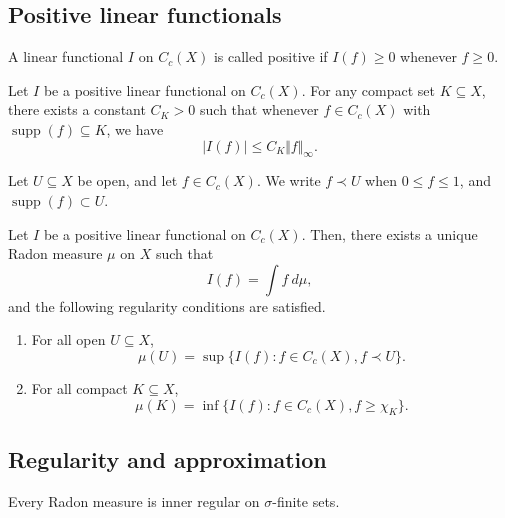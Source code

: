 \documentclass[11pt]{article}
\newcommand{\norm}[1]{\Vert #1 \Vert}
\DeclareMathOperator{\supp}{supp}
\theoremstyle{definition}
\theoremstyle{remark}
\begin{document}
    \subsection{Positive linear functionals}

    \begin{definition}
        A linear functional $I$ on $C_c(X)$ is called positive if $I(f) \geq 0$
        whenever $f \geq 0$.
    \end{definition}

    \begin{lemma}
        Let $I$ be a positive linear functional on $C_c(X)$. For any compact set $K
        \subseteq X$, there exists a constant $C_K > 0$ such that whenever $f \in
        C_c(X)$ with $\supp(f) \subseteq K$, we have \[
            |I(f)| \leq C_K \norm{f}_\infty.
        \]
    \end{lemma}

    \begin{definition}
        Let $U \subseteq X$ be open, and let $f \in C_c(X)$. We write $f \prec U$
        when $0 \leq f \leq 1$, and $\supp(f) \subset U$.
    \end{definition}

    \begin{theorem}
        Let $I$ be a positive linear functional on $C_c(X)$. Then, there exists a
        unique Radon measure $\mu$ on $X$ such that \[
            I(f) = \int f\:d\mu,
        \] and the following regularity conditions are satisfied. \begin{enumerate}
            \item For all open $U \subseteq X$, \[
                \mu(U) = \sup\{I(f): f \in C_c(X), f \prec U\}.
            \]
            \item For all compact $K \subseteq X$, \[
                \mu(K) = \inf\{I(f): f \in C_c(X), f \geq \chi_K\}.
            \]
        \end{enumerate}
    \end{theorem}


    \subsection{Regularity and approximation}

    \begin{lemma}
        Every Radon measure is inner regular on $\sigma$-finite sets.
    \end{lemma}
\end{document}
